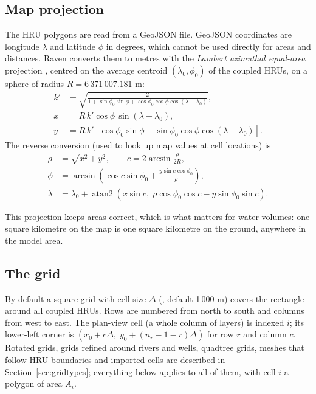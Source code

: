 \subsection{Map projection}
The HRU polygons are read from a GeoJSON file. GeoJSON coordinates are longitude $\lambda$ and latitude $\phi$ in
degrees, which cannot be used directly for areas and distances. Raven converts them to metres with the
\emph{Lambert azimuthal equal-area} projection \cite{snyder1987map}, centred on the average centroid
$(\lambda_0,\phi_0)$ of the coupled HRUs, on a sphere of radius $R=6\,371\,007.181$ m:
\begin{align}
k' &= \sqrt{\frac{2}{1+\sin\phi_0\sin\phi+\cos\phi_0\cos\phi\cos(\lambda-\lambda_0)}},\\
x &= R\,k'\cos\phi\,\sin(\lambda-\lambda_0),\\
y &= R\,k'\left[\cos\phi_0\sin\phi-\sin\phi_0\cos\phi\cos(\lambda-\lambda_0)\right].
\end{align}
The reverse conversion (used to look up map values at cell locations) is
\begin{align}
\rho&=\sqrt{x^2+y^2},\qquad c=2\arcsin\frac{\rho}{2R},\\
\phi&=\arcsin\!\left(\cos c\sin\phi_0+\frac{y\sin c\cos\phi_0}{\rho}\right),\\
\lambda&=\lambda_0+\operatorname{atan2}\!\left(x\sin c,\;\rho\cos\phi_0\cos c-y\sin\phi_0\sin c\right).
\end{align}
\begin{plain}
This projection keeps areas correct, which is what matters for water volumes: one square kilometre on the map is one
square kilometre on the ground, anywhere in the model area.
\end{plain}

\subsection{The grid}
By default a square grid with cell size $\Delta$ (, default 1\,000 m) covers the rectangle around all
coupled HRUs. Rows are numbered from north to south and columns from west to east. The plan-view cell (a whole column of
layers) is indexed $i$; its lower-left corner is $(x_0+c\Delta,\;y_0+(n_r-1-r)\Delta)$ for row $r$ and column $c$. Rotated
grids, grids refined around rivers and wells, quadtree grids, meshes that follow HRU boundaries and imported cells are
described in Section~\ref{sec:gridtypes}; everything below applies to all of them, with cell $i$ a polygon of area $A_i$.


